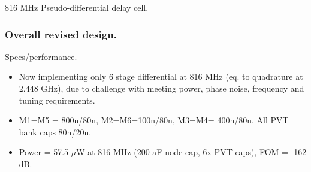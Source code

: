 \documentclass[t, screen, aspectratio=43]{beamer}
\begin{document}
\begin{frame}
\begin{block}{816 MHz Pseudo-differential delay cell.}
\begin{minipage}{6cm}
\begin{figure}[htb!]
			\end{figure}
		\end{minipage}%

	\end{block}	
\end{frame}

\begin{frame}
	\frametitle{Overall revised design.}
	\begin{block}{Specs/performance.}
		\begin{minipage}{6cm}
			\vspace{1em}
			\tiny

			\begin{itemize}[itemsep=4pt,label=\protect---]
				\item Now implementing only 6 stage differential at 816 MHz (eq. to quadrature at 2.448 GHz), due to challenge with meeting power, phase noise, frequency and tuning requirements.
				\item M1=M5 = 800n/80n, M2=M6=100n/80n, M3=M4= 400n/80n. All PVT bank caps 80n/20n.
				\item Power = 57.5 $\mu$W at 816 MHz (200 aF node cap, 6x PVT caps), FOM = -162 dB. 
			\end{itemize}


\end{minipage}
\end{block}
\end{frame}
\end{document}
